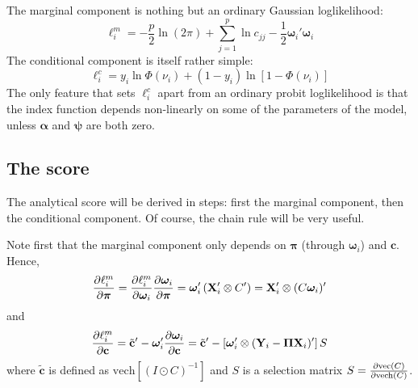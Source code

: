 \documentclass[a4paper,10pt]{article}
\newcommand{\pder}[2]{\ensuremath\frac{\partial #1}{\partial #2}}
\newcommand{\Depvar}{y_{i}}
\newcommand{\Endog}{\mathbf{Y}_{i}}
\newcommand{\ExoInst}{\mathbf{X}_{i}}
\newcommand{\ScRfDist}{\bm{\omega}_i}
\newcommand{\RfPar}{\bm{\Pi}}
\newcommand{\vRfPar}{\bm{\pi}}
\newcommand{\VarPar}{\bm{\alpha}}
\newcommand{\ScCov}{\bm{\psi}}
\newcommand{\vechC}{\mathbf{c}}
\begin{document}
The marginal component is nothing but an ordinary Gaussian
loglikelihood:
\[
\ell^m_i = -\frac{p}{2}\ln(2\pi) + \sum_{j=1}^p \ln c_{jj} - 
\frac{1}{2}\ScRfDist' \ScRfDist
\]
The conditional component is itself rather simple:
\begin{equation}
  \ell^c_i = \Depvar \ln\Phi(\nu_i) + \left(1-\Depvar\right)
  \ln \left[1-\Phi\left(\nu_i \right)\right]
\end{equation}
The only feature that sets $\ell^c_i$ apart from an ordinary probit
loglikelihood is that the index function depends non-linearly on some
of the parameters of the model, unless $\VarPar$ and $\ScCov$ are both
zero.

\subsection{The score}
\label{sec:score}

The analytical score will be derived in steps: first the marginal
component, then the conditional component. Of course, the chain rule
will be very useful.

Note first that the marginal component only depends on $\vRfPar$
(through $\ScRfDist$) and $\vechC$. Hence,
\[
\pder{\ell^m_i}{\vRfPar} = \pder{\ell^m_i}{\ScRfDist}
\pder{\ScRfDist}{\vRfPar} = \ScRfDist' \left( \ExoInst' \otimes C'
\right) =  \ExoInst' \otimes (C \ScRfDist)'
\]
and
\[
\pder{\ell^m_i}{\vechC} = \tilde{\mathbf{c}}' -
\ScRfDist'\pder{\ScRfDist}{\vechC} = \tilde{\mathbf{c}}' -
\left[\ScRfDist' \otimes (\Endog - \RfPar \ExoInst)' \right] S
\]
where $\tilde{\mathbf{c}}$ is defined as $\mathrm{vech}\left[ (I \odot
C)^{-1} \right]$ and $S$ is a selection matrix $S = \pder{\mathrm{vec}(C)}{\mathrm{vech}(C)}$.
\end{document}
